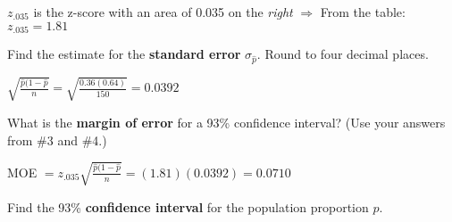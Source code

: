 \documentclass[noanswers]{exam}
\begin{document}
\begin{questions}
\begin{solution}[\stretch{1}]
$z_{.035}$ is the z-score with an area of 0.035 on the \textit{right} $\Rightarrow$ From the table: $z_{.035}=1.81$

\vspace{2mm}


\vspace{1mm}
\end{solution}

\question Find the estimate for the \textbf{standard error} $\sigma_{\hat{p}}$. Round to four decimal places.

\begin{solution}[\stretch{1}]

\vspace{1mm}

$\sqrt{\frac{\hat{p}(1-\hat{p}}{n}}=\sqrt{\frac{0.36(0.64)}{150}}=0.0392$

\vspace{1mm}
\end{solution}

\question What is the \textbf{margin of error} for a 93\% confidence interval? (Use your answers from \#3 and \#4.)

\begin{solution}[\stretch{1}]
\vspace{1mm}
MOE $=z_{.035}\sqrt{\frac{\hat{p}(1-\hat{p}}{n}}=(1.81)(0.0392)=0.0710$
\vspace{1mm}
\end{solution}

\question Find the 93\% \textbf{confidence interval} for the population proportion $p$.


\end{questions}
\end{document}
